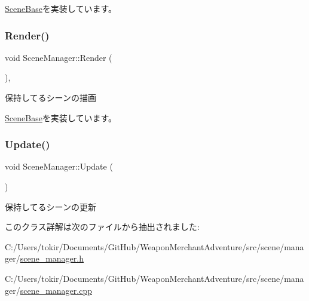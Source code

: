 \mbox{\hyperlink{class_scene_base_a24d7db43c819924dc8b07b436f6d3148}{Scene\+Base}}を実装しています。

\mbox{\label{class_scene_manager_a968ae7a0065b793f139bda6bcc58d106}} 
\subsubsection{\texorpdfstring{Render()}{Render()}}
{\footnotesize\ttfamily void Scene\+Manager\+::\+Render (\begin{DoxyParamCaption}{ }\end{DoxyParamCaption})\hspace{0.3cm}{\ttfamily [final]}, {\ttfamily [virtual]}}



保持してるシーンの描画 



\mbox{\hyperlink{class_scene_base_ad981674ce731ea267f398e889bbb9dc3}{Scene\+Base}}を実装しています。

\mbox{\label{class_scene_manager_a63dcf65832d6a2c190bf496d9a3b00a3}} 
\subsubsection{\texorpdfstring{Update()}{Update()}}
{\footnotesize\ttfamily void Scene\+Manager\+::\+Update (\begin{DoxyParamCaption}{ }\end{DoxyParamCaption})}



保持してるシーンの更新 



このクラス詳解は次のファイルから抽出されました\+:\begin{DoxyCompactItemize}
\item 
C\+:/\+Users/tokir/\+Documents/\+Git\+Hub/\+Weapon\+Merchant\+Adventure/src/scene/manager/\mbox{\hyperlink{scene__manager_8h}{scene\+\_\+manager.\+h}}\item 
C\+:/\+Users/tokir/\+Documents/\+Git\+Hub/\+Weapon\+Merchant\+Adventure/src/scene/manager/\mbox{\hyperlink{scene__manager_8cpp}{scene\+\_\+manager.\+cpp}}\end{DoxyCompactItemize}
